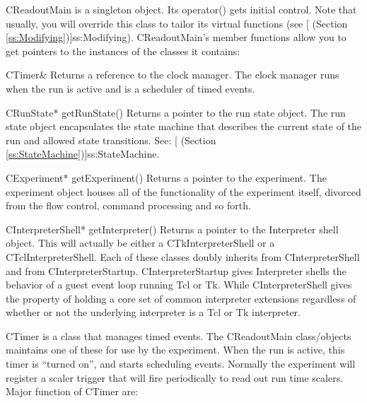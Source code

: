      \begin{description}
	 \item{CReadoutMain} is a singleton object. Its operator()
	    gets initial control.  Note that usually, you will override
	    this class to tailor its virtual functions (see 
	    [
	       (Section \ref{ss:Modifying})]{ss:Modifying}).
	       CReadoutMain's member functions allow you to get 
	       pointers to the instances of the classes it contains:
	       
	       \begin{description}
		  \item{CTimer\& }
		     Returns a reference to the clock manager.  The
		     clock manager runs when the run is active and
		     is a scheduler of timed events.
		  \item{CRunState* getRunState()}
		     Returns a pointer to the run state object.  The run state
		     object encapsulates the state machine that
		     describes the current state of the run and
		     allowed state transitions.  See:
		     [
			(Section \ref{ss:StateMachine})]{ss:StateMachine}.
		  \item{CExperiment* getExperiment()}
		     Returns a pointer to the experiment.  The experiment
		     object houses all of the functionality of the experiment itself,
		     divorced from the flow control, command processing and so 
		     forth.
		  \item{CInterpreterShell* getInterpreter()}
		     Returns a pointer to the Interpreter shell object.  This will 
		     actually be either a CTkInterpreterShell or a CTclInterpreterShell.
		     Each of these classes doubly inherits from CInterpreterShell and
		     from CInterpreterStartup.  CInterpreterStartup gives Interpreter
		     shells the behavior of a guest event loop running Tcl or Tk.
		     While CInterpreterShell gives the property of holding a core set
		     of common interpreter extensions regardless of whether or not
		     the underlying interpreter is a Tcl or Tk interpreter.
	       \end{description}
	       \htmlrule
	 \item{CTimer} is a class that manages timed events.  The
	    CReadoutMain class/objects maintains one of these for use by
	    the experiment.  When the run is active, this timer is ``turned on'',
	    and starts scheduling events.  Normally the experiment will register
	    a scaler trigger that will fire periodically to read out run time
	    scalers.  Major function of CTimer are:
	    

\end{description}
